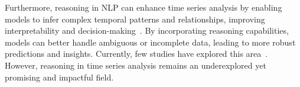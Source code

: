 Furthermore, reasoning in NLP can enhance time series analysis by enabling models to infer complex temporal patterns and relationships, improving interpretability and decision-making~\cite{potosnak2024implicit,cai2024timeseriesexam}. By incorporating reasoning capabilities, models can better handle ambiguous or incomplete data, leading to more robust predictions and insights. Currently, few studies have explored this area~\cite{chow2024towards,ye2024beyond,xie2024chatts}. However, reasoning in time series analysis remains an underexplored yet promising and impactful field.